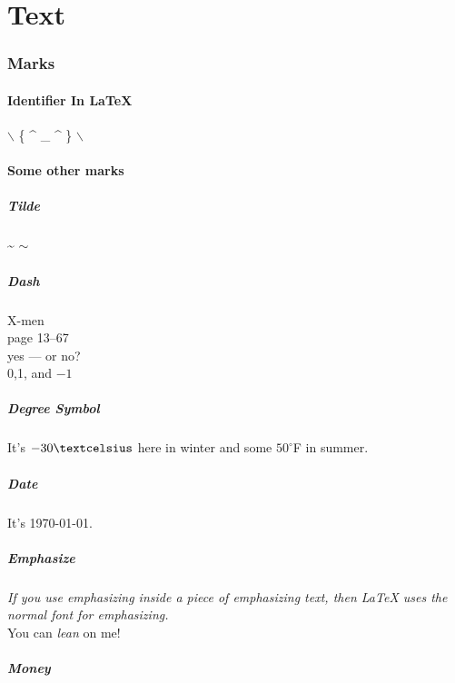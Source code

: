\documentclass[12pt]{article}
\begin{document}
\part{Text}
\section{Marks}\label{sec1}
\subsection{Identifier In \LaTeX}
$\backslash$ \{ \^{} \_{} \^{} \} $\backslash$

\subsection{Some other marks}
\subsubsection{Tilde}
\~{} \qquad $\sim$  %
\subsubsection{Dash}
X-men \\
page 13--67\\
yes --- or no?\\
0,1, and $-1$

\subsubsection{Degree Symbol}
It's $-30\textcelsius$ here in winter and some $50^{\circ}$F in summer.

\subsubsection{Date}
It's \today.

\subsubsection{Emphasize}
\emph{If you use emphasizing inside a piece of emphasizing text, then \LaTeX{} uses the \emph{normal} font for emphasizing.}\\
You can \textsl{lean} on me!

\subsubsection{Money}
\texteuro \  \textdollar
\end{document}
